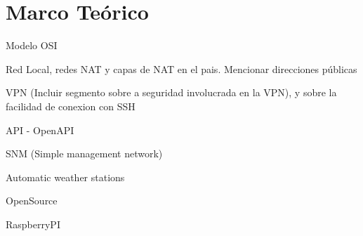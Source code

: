 \section{Marco Teórico}

Modelo OSI

Red Local, redes NAT y capas de NAT en el pais. Mencionar direcciones públicas

VPN (Incluir segmento sobre a seguridad involucrada en la VPN), y sobre la facilidad de conexion con SSH

API - OpenAPI

SNM (Simple management network)

Automatic weather stations

OpenSource

RaspberryPI
